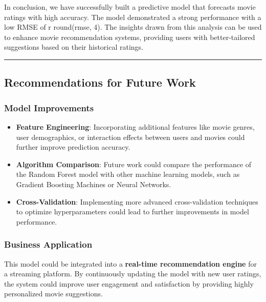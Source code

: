 \documentclass[
]{article}
\providecommand{\tightlist}{%
  \setlength{\itemsep}{0pt}\setlength{\parskip}{0pt}}
\begin{document}
In conclusion, we have successfully built a predictive model that
forecasts movie ratings with high accuracy. The model demonstrated a
strong performance with a low RMSE of r round(rmse, 4). The insights
drawn from this analysis can be used to enhance movie recommendation
systems, providing users with better-tailored suggestions based on their
historical ratings.

\begin{center}\rule{0.5\linewidth}{0.5pt}\end{center}

\subsection{Recommendations for Future
Work}\label{recommendations-for-future-work}

\subsubsection{Model Improvements}\label{model-improvements}

\begin{itemize}
\tightlist
\item
  \textbf{Feature Engineering}: Incorporating additional features like
  movie genres, user demographics, or interaction effects between users
  and movies could further improve prediction accuracy.
\item
  \textbf{Algorithm Comparison}: Future work could compare the
  performance of the Random Forest model with other machine learning
  models, such as Gradient Boosting Machines or Neural Networks.
\item
  \textbf{Cross-Validation}: Implementing more advanced cross-validation
  techniques to optimize hyperparameters could lead to further
  improvements in model performance.
\end{itemize}

\subsubsection{Business Application}\label{business-application}

This model could be integrated into a \textbf{real-time recommendation
engine} for a streaming platform. By continuously updating the model
with new user ratings, the system could improve user engagement and
satisfaction by providing highly personalized movie suggestions.
\end{document}
